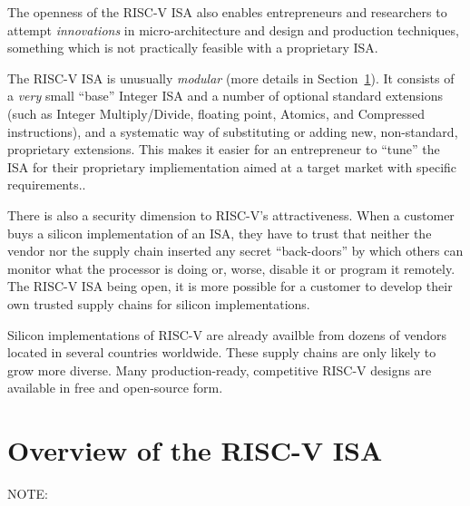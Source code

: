 The openness of the RISC-V ISA also enables entrepreneurs and
researchers to attempt \emph{innovations} in micro-architecture and
design and production techniques, something which is not practically
feasible with a proprietary ISA.

The RISC-V ISA is unusually \emph{modular} (more details in
Section~\ref{Sec_ISA_Overview}).  It consists of a \emph{very} small
``base'' Integer ISA and a number of optional standard extensions
(such as Integer Multiply/Divide, floating point, Atomics, and
Compressed instructions), and a systematic way of substituting or
adding new, non-standard, proprietary extensions.  This makes it
easier for an entrepreneur to ``tune'' the ISA for their proprietary
impliementation aimed at a target market with specific requirements..

There is also a security dimension to RISC-V's attractiveness.  When a
customer buys a silicon implementation of an ISA, they have to trust
that neither the vendor nor the supply chain inserted any secret
``back-doors'' by which others can monitor what the processor is doing
or, worse, disable it or program it remotely.  The RISC-V ISA being
open, it is more possible for a customer to develop their own trusted
supply chains for silicon implementations.

Silicon implementations of RISC-V are already availble from dozens of
vendors located in several countries worldwide.  These supply chains
are only likely to grow more diverse.  Many production-ready,
competitive RISC-V designs are available in free and open-source form.


\section{Overview of the RISC-V ISA}

\label{Sec_ISA_Overview}


NOTE: 

